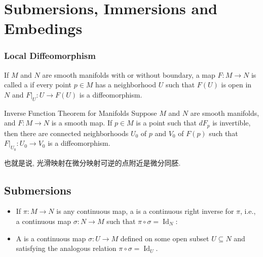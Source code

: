 \documentclass[../main.tex]{subfiles}
\begin{document}
\ifSubfilesClassLoaded{

    
}{}

\chapter{ Submersions, Immersions and Embedings }
\subsection{Local Diffeomorphism}
\begin{definition}{}{}
    If $M$ and $N$ are smooth manifolds with or without boundary, a map $F: M \to N$ is called a  if every point $p \in M$ has a neighborhood $U$ such that $F(U)$ is open in $N$ and $F|_U : U \to F(U)$ is a diffeomorphism. 
\end{definition}
\begin{theorem}{Inverse Function Theorem for Manifolds}{}
Suppose $M$ and $N$ are smooth manifolds, and $F: M \to N$ is a smooth map. If $p \in M$ is a point such that $dF_p$ is invertible, then there are connected neighborhoods $U_0$ of $p$ and $V_0$ of $F(p)$ such that $F|_{U_0}: U_0 \to V_0$ is a diffeomorphism.
\end{theorem}

\begin{note}
    也就是说, 光滑映射在微分映射可逆的点附近是微分同胚.
\end{note}

\section{Submersions}

\begin{definition}{}{}
    \begin{itemize}
        \item If $\pi : M \to N$ is any continuous map, a  is a continuous right inverse for $\pi$, i.e., a continuous map $\sigma : N \to M$ such that $\pi \circ \sigma = \operatorname{Id}_N$:
\begin{center}
\end{center}
\item A  is a continuous map $\sigma : U \to M$ defined on some open subset $U \subseteq N$ and satisfying the analogous relation $\pi \circ \sigma = \operatorname{Id}_U$. 
    \end{itemize}
    
\end{definition}
\end{document}
